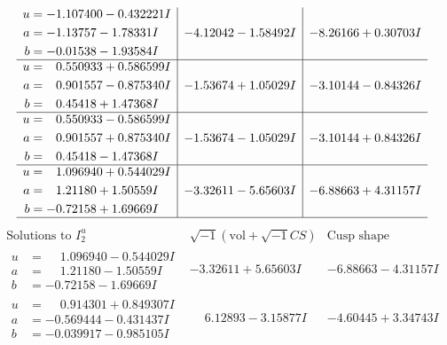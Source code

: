 \documentclass[1p]{elsarticle_modified}
\theoremstyle{definition}
\newcommand{\I}{\sqrt{-1}}
\begin{document}
$$\begin{array}{c|c|c}
\begin{aligned}
u &= -1.107400 - 0.432221 I \\
a &= -1.13757 - 1.78331 I \\
b &= -0.01538 - 1.93584 I\end{aligned}
 & -4.12042 - 1.58492 I & -8.26166 + 0.30703 I \\ \hline\begin{aligned}
u &= \phantom{-}0.550933 + 0.586599 I \\
a &= \phantom{-}0.901557 - 0.875340 I \\
b &= \phantom{-}0.45418 + 1.47368 I\end{aligned}
 & -1.53674 + 1.05029 I & -3.10144 - 0.84326 I \\ \hline\begin{aligned}
u &= \phantom{-}0.550933 - 0.586599 I \\
a &= \phantom{-}0.901557 + 0.875340 I \\
b &= \phantom{-}0.45418 - 1.47368 I\end{aligned}
 & -1.53674 - 1.05029 I & -3.10144 + 0.84326 I \\ \hline\begin{aligned}
u &= \phantom{-}1.096940 + 0.544029 I \\
a &= \phantom{-}1.21180 + 1.50559 I \\
b &= -0.72158 + 1.69669 I\end{aligned}
 & -3.32611 - 5.65603 I & -6.88663 + 4.31157 I\\
 \hline 
 \end{array}$$\newpage$$\begin{array}{c|c|c}  
\text{Solutions to }I^u_{2}& \I (\text{vol} + \sqrt{-1}CS) & \text{Cusp shape}\\
 \hline 
\begin{aligned}
u &= \phantom{-}1.096940 - 0.544029 I \\
a &= \phantom{-}1.21180 - 1.50559 I \\
b &= -0.72158 - 1.69669 I\end{aligned}
 & -3.32611 + 5.65603 I & -6.88663 - 4.31157 I \\ \hline\begin{aligned}
u &= \phantom{-}0.914301 + 0.849307 I \\
a &= -0.569444 - 0.431437 I \\
b &= -0.039917 - 0.985105 I\end{aligned}
 & \phantom{-}6.12893 - 3.15877 I & -4.60445 + 3.34743 I \\ \hline\begin{aligned}

\end{aligned}
\end{array}$$
\end{document}
